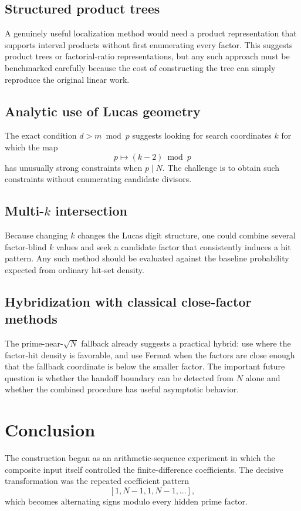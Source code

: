 \documentclass[11pt,a4paper]{article}
\newcommand{\Arith}{\mathrm{ArithSeg}}
\begin{document}
\subsection{Structured product trees}
A genuinely useful localization method would need a product representation that supports interval products without first enumerating every factor. This suggests product trees or factorial-ratio representations, but any such approach must be benchmarked carefully because the cost of constructing the tree can simply reproduce the original linear work.

\subsection{Analytic use of Lucas geometry}
The exact condition $d>m\bmod p$ suggests looking for search coordinates $k$ for which the map
\[
p\mapsto (k-2)\bmod p
\]
has unusually strong constraints when $p\mid N$. The challenge is to obtain such constraints without enumerating candidate divisors.

\subsection{Multi-$k$ intersection}
Because changing $k$ changes the Lucas digit structure, one could combine several factor-blind $k$ values and seek a candidate factor that consistently induces a hit pattern. Any such method should be evaluated against the baseline probability expected from ordinary hit-set density.

\subsection{Hybridization with classical close-factor methods}
The prime-near-$\sqrt N$ fallback already suggests a practical hybrid: use \Arith{} where the factor-hit density is favorable, and use Fermat when the factors are close enough that the fallback coordinate is below the smaller factor. The important future question is whether the handoff boundary can be detected from $N$ alone and whether the combined procedure has useful asymptotic behavior.

\section{Conclusion}
\label{sec:conclusion}

The \Arith{} construction began as an arithmetic-sequence experiment in which the composite input itself controlled the finite-difference coefficients. The decisive transformation was the repeated coefficient pattern
\[
[1,N-1,1,N-1,\ldots],
\]
which becomes alternating signs modulo every hidden prime factor.
\end{document}
